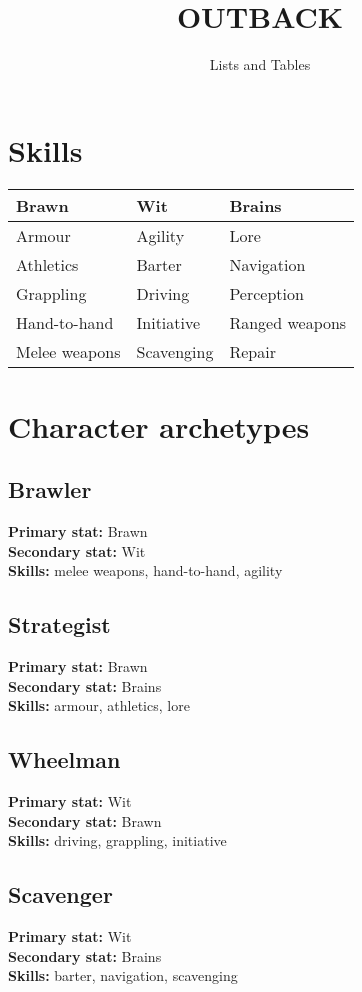 \documentclass[10pt, a4paper, twocolumn]{article}
\title{\uppercase{Outback}}
\subtitle{Lists and Tables}
\date{}
\begin{document}
\twocolumn[
  \begin{@twocolumnfalse}
    \maketitle
  \end{@twocolumnfalse}
]

\section{Skills}
\begin{tabular}{lll}
  Brawn         & Wit        & Brains         \\
  \hline
  Armour        & Agility    & Lore           \\
  Athletics     & Barter     & Navigation     \\
  Grappling     & Driving    & Perception     \\
  Hand-to-hand  & Initiative & Ranged weapons \\
  Melee weapons & Scavenging & Repair
\end{tabular}

\section{Character archetypes}
\subsection{Brawler}
\textbf{Primary stat:} Brawn\\
\textbf{Secondary stat:} Wit\\
\textbf{Skills:} melee weapons, hand-to-hand, agility
\subsection{Strategist}
\textbf{Primary stat:} Brawn\\
\textbf{Secondary stat:} Brains\\
\textbf{Skills:} armour, athletics, lore
\subsection{Wheelman}
\textbf{Primary stat:} Wit\\
\textbf{Secondary stat:} Brawn\\
\textbf{Skills:} driving, grappling, initiative
\subsection{Scavenger}
\textbf{Primary stat:} Wit\\
\textbf{Secondary stat:} Brains\\
\textbf{Skills:} barter, navigation, scavenging
\end{document}
